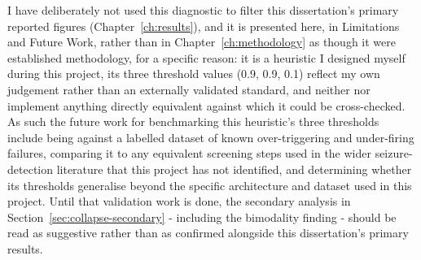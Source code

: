 I have deliberately not used this diagnostic to filter this dissertation's primary reported figures (Chapter~\ref{ch:results}), and it is presented here, in Limitations and Future Work, rather than in Chapter~\ref{ch:methodology} as though it were established methodology, for a specific reason: it is a heuristic I designed myself during this project, its three threshold values (0.9, 0.9, 0.1) reflect my own judgement rather than an externally validated standard, and neither \citet{ali2024} nor \citet{shoeb2009} implement anything directly equivalent against which it could be cross-checked. 
As such the future work for benchmarking this heuristic's three thresholds include being against a labelled dataset of known over-triggering and under-firing failures, comparing it to any equivalent screening steps used in the wider seizure-detection literature that this project has not identified, and determining whether its thresholds generalise beyond the specific architecture and dataset used in this project. Until that validation work is done, the secondary analysis in Section~\ref{sec:collapse-secondary} - including the bimodality finding - should be read as suggestive rather than as confirmed alongside this dissertation's primary results.